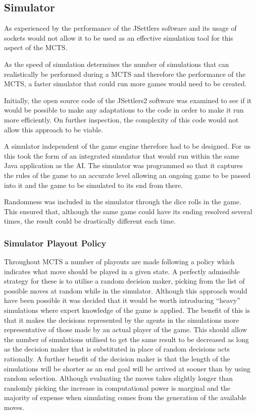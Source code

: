 \documentclass[]{article}
\begin{document}
\subsection{Simulator}
As experienced by \textcite{szita2009monte} the performance of the JSettlers software and its usage of sockets would not allow it to be used as an effective simulation tool for this aspect of the MCTS. 

\par As the speed of simulation determines the number of simulations that can realistically be performed during a MCTS and therefore the performance of the MCTS, a faster simulator that could run more games would need to be created. 

\par Initially, the open source code of the JSettlers2 software was examined to see if it would be possible to make any adaptations to the code in order to make it run more efficiently. On further inspection, the complexity of this code would not allow this approach to be viable.

\par A simulator independent of the game engine therefore had to be designed. For us this took the form of an integrated simulator that would run within the same Java application as the AI. The simulator was programmed so that it captures the rules of the game to an accurate level allowing an ongoing game to be passed into it and the game to be simulated to its end from there.

\par Randomness was included in the simulator through the dice rolls in the game. This ensured that, although the same game could have its ending resolved several times, the result could be drastically different each time.

\subsubsection{Simulator Playout Policy}
\par Throughout MCTS a number of playouts are made following a policy which indicates what move should be played in a given state. A perfectly admissible strategy for these is to utilise a random decision maker, picking from the list of possible moves at random while in the simulator. Although this approach would have been possible it was decided that it would be worth introducing ``heavy'' simulations where expert knowledge of the game is applied. The benefit of this is that it makes the decisions represented by the agents in the simulations more representative of those made by an actual player of the game. This should allow the number of simulations utilised to get the same result to be decreased as long as the decision maker that is substituted in place of random decisions acts rationally. A further benefit of the decision maker is that the length of the simulations will be shorter as an end goal will be arrived at sooner than by using random selection. Although evaluating the moves takes slightly longer than randomly picking the increase in computational power is marginal and the majority of expense when simulating comes from the generation of the available moves.
\end{document}
